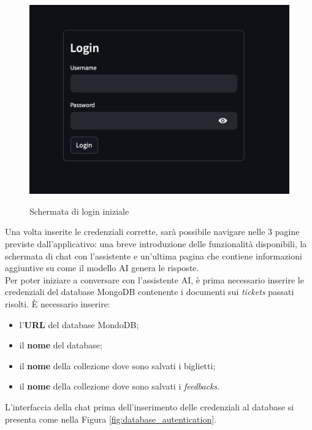 \begin{figure}[H]
    \centering
    \includegraphics[alt={Schermata di login iniziale}, width=0.7\columnwidth]{img/beforeSignin.png}
    \caption{Schermata di login iniziale}
    \label{fig:first_autentication}
\end{figure}

Una volta inserite le credenziali corrette, sarà possibile navigare nelle 3 pagine previste dall'applicativo: una breve introduzione delle funzionalità disponibili, la schermata di chat con l'assistente e un'ultima pagina che contiene informazioni aggiuntive su come il modello AI genera le risposte.\\
Per poter iniziare a conversare con l'assistente AI, è prima necessario inserire le credenziali del database MongoDB contenente i documenti sui \textit{tickets} passati risolti.
È necessario inserire:
\begin{itemize}
    \item l'\textbf{URL} del database MondoDB;
    \item il \textbf {nome} del database;
    \item il \textbf{nome} della collezione dove sono salvati i biglietti;
    \item il \textbf{nome} della collezione dove sono salvati i \textit{feedbacks}.
\end{itemize}

L'interfaccia della chat prima dell'inserimento delle credenziali al database si presenta come nella Figura \ref{fig:database_autentication}.

